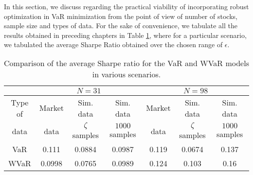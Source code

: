 In this section, we discuss regarding the practical viability of incorporating robust optimization in VaR minimization from the point of view of number of stocks, sample size and types of data. For the sake of convenience, we tabulate all the results obtained in preceding chapters in Table \ref{tab:var_conc}, where for a particular scenario, we tabulated the average Sharpe Ratio obtained over the chosen range of $\epsilon$.
\begin{table}[!h]
  \centering
  \small
    \captionsetup{justification=centering}
  \begin{tabular}{|c|c|c|c|c|c|c|}
    \hline
   \multirow{2}{*}{} $N$ &
      \multicolumn{3}{c|}{$N=31$} &
      \multicolumn{3}{c|}{$N=98$}  \\
    \hline
    Type of & Market & Sim. data & Sim. data & Market & Sim. data & Sim. data \\
    data & data & $\zeta$ samples & $1000$ samples & data & $\zeta$ samples & $1000$ samples \\
    \hline
    VaR & 0.111 & 0.0884 & 0.0987 & 0.119 & 0.0674 & 0.137 \\
    \hline
    WVaR & 0.0998 & 0.0765 & 0.0989 & 0.124 & 0.103 & 0.16 \\
    \hline
    
  \end{tabular}
  \caption{Comparison of the average Sharpe ratio for the VaR and WVaR models in various scenarios.}
  \label{tab:var_conc}
\end{table}
    

